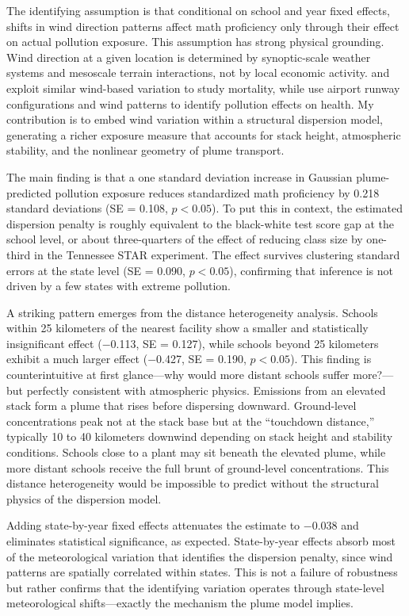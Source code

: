 \documentclass[12pt]{article}
\begin{document}
The identifying assumption is that conditional on school and year fixed effects, shifts in wind direction patterns affect math proficiency only through their effect on actual pollution exposure. This assumption has strong physical grounding. Wind direction at a given location is determined by synoptic-scale weather systems and mesoscale terrain interactions, not by local economic activity. \citet{deryugina2019} and \citet{anderson2020} exploit similar wind-based variation to study mortality, while \citet{schlenker2016} use airport runway configurations and wind patterns to identify pollution effects on health. My contribution is to embed wind variation within a structural dispersion model, generating a richer exposure measure that accounts for stack height, atmospheric stability, and the nonlinear geometry of plume transport.

The main finding is that a one standard deviation increase in Gaussian plume-predicted pollution exposure reduces standardized math proficiency by 0.218 standard deviations (SE = 0.108, $p < 0.05$). To put this in context, the estimated dispersion penalty is roughly equivalent to the black-white test score gap at the school level, or about three-quarters of the effect of reducing class size by one-third in the Tennessee STAR experiment. The effect survives clustering standard errors at the state level (SE = 0.090, $p < 0.05$), confirming that inference is not driven by a few states with extreme pollution.

A striking pattern emerges from the distance heterogeneity analysis. Schools within 25 kilometers of the nearest facility show a smaller and statistically insignificant effect ($-$0.113, SE = 0.127), while schools beyond 25 kilometers exhibit a much larger effect ($-$0.427, SE = 0.190, $p < 0.05$). This finding is counterintuitive at first glance---why would more distant schools suffer more?---but perfectly consistent with atmospheric physics. Emissions from an elevated stack form a plume that rises before dispersing downward. Ground-level concentrations peak not at the stack base but at the ``touchdown distance,'' typically 10 to 40 kilometers downwind depending on stack height and stability conditions. Schools close to a plant may sit beneath the elevated plume, while more distant schools receive the full brunt of ground-level concentrations. This distance heterogeneity would be impossible to predict without the structural physics of the dispersion model.

Adding state-by-year fixed effects attenuates the estimate to $-$0.038 and eliminates statistical significance, as expected. State-by-year effects absorb most of the meteorological variation that identifies the dispersion penalty, since wind patterns are spatially correlated within states. This is not a failure of robustness but rather confirms that the identifying variation operates through state-level meteorological shifts---exactly the mechanism the plume model implies.
\end{document}

